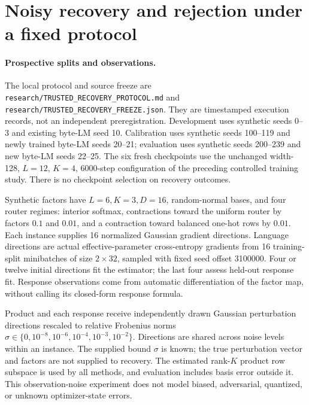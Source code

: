 \section{Noisy recovery and rejection under a fixed protocol}
\label{app:trusted-experiments}

\paragraph{Prospective splits and observations.}
The local protocol and source freeze are
\texttt{research/TRUSTED\_RECOVERY\_PROTOCOL.md} and
\texttt{research/TRUSTED\_RECOVERY\_FREEZE.json}.
They are timestamped execution records, not an independent preregistration.
Development uses synthetic seeds 0--3 and existing byte-LM seed 10.
Calibration uses synthetic seeds 100--119 and newly trained byte-LM seeds
20--21; evaluation uses synthetic seeds 200--239 and new byte-LM seeds
22--25. The six fresh checkpoints use the unchanged width-128, $L=12$,
$K=4$, 6000-step configuration of the preceding controlled training study.
There is no checkpoint selection on recovery outcomes.

Synthetic factors have $L=6,K=3,D=16$, random-normal bases, and four router
regimes: interior softmax, contractions toward the uniform router by factors
$0.1$ and $0.01$, and a contraction toward balanced one-hot rows by $0.01$.
Each instance supplies 16 normalized Gaussian gradient directions.
Language directions are actual effective-parameter cross-entropy gradients
from 16 training-split minibatches of size $2\times32$, sampled with fixed
seed offset 3100000. Four or twelve initial directions fit the estimator;
the last four assess held-out response fit. Response observations come from
automatic differentiation of the factor map, without calling its closed-form
response formula.

Product and each response receive independently drawn Gaussian perturbation
directions rescaled to relative Frobenius norms
$\sigma\in\{0,10^{-8},10^{-6},10^{-4},10^{-3},10^{-2}\}$.
Directions are shared across noise levels within an instance.
The supplied bound $\sigma$ is known; the true perturbation vector and factors
are not supplied to recovery. The estimated rank-$K$ product row subspace
is used by all methods, and evaluation includes basis error outside it.
This observation-noise experiment does not model biased, adversarial,
quantized, or unknown optimizer-state errors.

